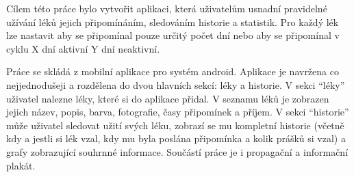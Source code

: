 \documentclass[../TakeYourPill.tex]{subfiles}
\begin{document}
Cílem této práce bylo vytvořit aplikaci, která uživatelům usnadní pravidelné užívání léků jejich připomínáním, sledováním historie a statistik. Pro každý lék lze nastavit aby se připomínal pouze určitý počet dní nebo aby se připomínal v cyklu X dní aktivní Y dní neaktivní.

Práce se skládá z mobilní aplikace pro systém android. Aplikace je navržena co nejjednodušeji a rozdělena do dvou hlavních sekcí: léky a historie. V sekci \enquote{léky} uživatel nalezne léky, které si do aplikace přidal. V seznamu léků je zobrazen jejich název, popis, barva, fotografie, časy připomínek a příjem. V sekci \enquote{historie} může uživatel sledovat užití svých léku, zobrazí se mu kompletní historie (včetně kdy a jestli si lék vzal, kdy mu byla poslána připomínka a kolik prášků si vzal) a grafy zobrazující souhrnné informace. Součástí práce je i propagační a informační plakát.
\end{document}
